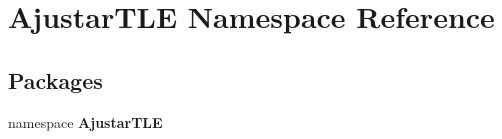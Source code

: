 \section{\-Ajustar\-T\-L\-E \-Namespace \-Reference}
\label{namespace_ajustar_t_l_e}
\subsection*{\-Packages}
\begin{DoxyCompactItemize}
\item 
namespace {\bf \-Ajustar\-T\-L\-E}
\end{DoxyCompactItemize}
